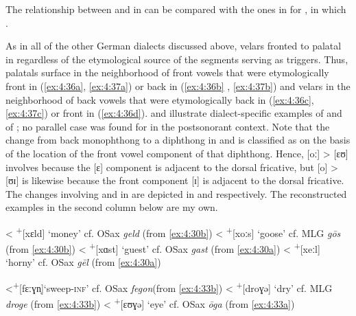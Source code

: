 The relationship between  and  in  can be compared with the ones in  for , in which   .

As in all of the other German dialects discussed above, velars fronted to palatal in  regardless of the etymological source of the segments serving as triggers. Thus, palatals surface in the neighborhood of front vowels that were etymologically front in (\ref{ex:4:36a}, \ref{ex:4:37a}) or back in (\ref{ex:4:36b} , \ref{ex:4:37b}) and velars in the neighborhood of back vowels that were etymologically back in (\ref{ex:4:36c}, \ref{ex:4:37c}) or front in (\ref{ex:4:36d}).  and  illustrate dialect-specific examples of  and  of ; no parallel case was found for  in the postsonorant context. Note that the change from back monophthong to a diphthong in  and  is classified as  on the basis of the location of the front vowel component of that diphthong. Hence, [oː] > [ɛʊ] involves  because the [ɛ] component is adjacent to the dorsal fricative, but [o] > [ʊɪ] is likewise  because the front component [ɪ] is adjacent to the dorsal fricative. The changes involving  and  in  are depicted in  and  respectively. The reconstructed examples in the second column below are my own.

\ea%
    \label{ex:4:36}
\ea\label{ex:4:36a} \relax [çɛlt] \tab < \tab  \textsuperscript{+}[xɛld] \tab ‘money’ \tab cf. OSax \textit{geld} \tab (from \ref{ex:4:30b})
\ex\label{ex:4:36b} \relax [çɛʊs] \tab < \tab  \textsuperscript{+}[xoːs] \tab ‘goose’ \tab cf. MLG \textit{gōs}   \tab (from \ref{ex:4:30b})
\ex\label{ex:4:36c} \relax [xɑst] \tab < \tab  \textsuperscript{+}[xɑst] \tab ‘guest’ \tab cf. OSax \textit{gast} \tab (from \ref{ex:4:30a})
\ex\label{ex:4:36d} \relax [xɑːl] \tab < \tab  \textsuperscript{+}[xeːl] \tab ‘horny’  \tab cf. OSax \textit{gēl}  \tab (from \ref{ex:4:30a})

\z 
\ex%
    \label{ex:4:37}
\ea\label{ex:4:37a} \relax [fɛːʝn̩] \tab  <\tab   \textsuperscript{+}[fɛːɣn̩]\tab   ‘sweep-\textsc{inf}’ \tab   cf. OSax \textit{fegon}\tab  (from \ref{ex:4:33b})
\ex\label{ex:4:37b} \relax [drʊɪʝə] \tab < \tab \textsuperscript{+}[droɣə]   \tab ‘dry’                  \tab cf. MLG \textit{droge}   \tab(from \ref{ex:4:33b})
\ex\label{ex:4:37c} \relax [ɛʊɣə]   \tab < \tab \textsuperscript{+}[ɛʊɣə]    \tab ‘eye’                  \tab cf. OSax \textit{ōga}    \tab(from \ref{ex:4:33a})
\z 
\z 

